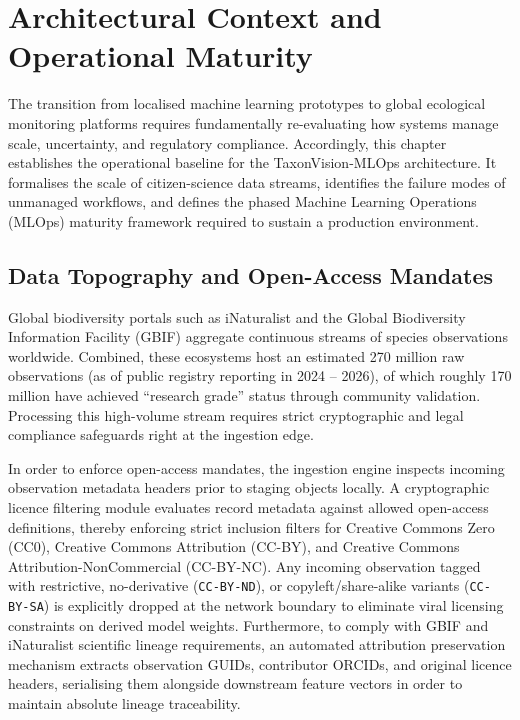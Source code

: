 \chapter{Architectural Context and Operational Maturity}
\label{ch:context_maturity}

The transition from localised machine learning prototypes to global ecological monitoring platforms requires fundamentally re-evaluating how systems manage scale, uncertainty, and regulatory compliance. Accordingly, this chapter establishes the operational baseline for the TaxonVision-MLOps architecture. It formalises the scale of citizen-science data streams, identifies the failure modes of unmanaged workflows, and defines the phased Machine Learning Operations (MLOps) maturity framework required to sustain a production environment.

\section{Data Topography and Open-Access Mandates}
Global biodiversity portals such as iNaturalist and the Global Biodiversity Information Facility (GBIF) aggregate continuous streams of species observations worldwide. Combined, these ecosystems host an estimated 270 million raw observations (as of public registry reporting in 2024 -- 2026), of which roughly 170 million have achieved ``research grade'' status through community validation. Processing this high-volume stream requires strict cryptographic and legal compliance safeguards right at the ingestion edge.

In order to enforce open-access mandates, the ingestion engine inspects incoming observation metadata headers prior to staging objects locally. A cryptographic licence filtering module evaluates record metadata against allowed open-access definitions, thereby enforcing strict inclusion filters for Creative Commons Zero (CC0), Creative Commons Attribution (CC-BY), and Creative Commons Attribution-NonCommercial (CC-BY-NC). Any incoming observation tagged with restrictive, no-derivative (\texttt{CC-BY-ND}), or copyleft/share-alike variants (\texttt{CC-BY-SA}) is explicitly dropped at the network boundary to eliminate viral licensing constraints on derived model weights. Furthermore, to comply with GBIF and iNaturalist scientific lineage requirements, an automated attribution preservation mechanism extracts observation GUIDs, contributor ORCIDs, and original licence headers, serialising them alongside downstream feature vectors in order to maintain absolute lineage traceability.

